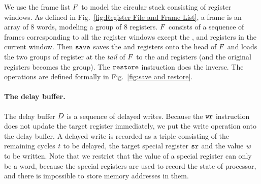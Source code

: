 We use the frame list $F$ to model the circular stack consisting
of register windows. As defined in Fig.~\ref{fig:Register File and Frame List},
a frame is an array of 8 words, modeling a group of 8 registers.
$F$ consists of a sequence of frames corresponding to all the
register windows except the \outRN{}, \localRN{} and \inRN{}
registers in the current window. Then $\texttt{save}$ saves the
\localRN{} and \inRN{} registers onto the head of $F$
and loads the two groups of register at the {\em tail} of $F$
to the \localRN{} and \outRN{} registers (and the original
\outRN{} registers becomes the \inRN{} group). The $\texttt{restore}$
instruction does the inverse. The operations are defined formally
in Fig.~\ref{fig:save and restore}.

\paragraph{\textbf{The delay buffer.}}
The delay buffer $D$ is a sequence of delayed writes.
Because the  $\texttt{wr}$ instruction
does not update the target register immediately,
we put the write operation onto the delay buffer.
A delayed write is recorded as a triple consisting of
the remaining cycles $t$ to be delayed,
the target special register $\texttt{sr}$ and the value 
$w$ to be written. Note that we restrict that 
the value of a special register can only be a word, 
because the special registers are used to record the 
state of processor, and there is impossible to 
store memory addresses in them.  

